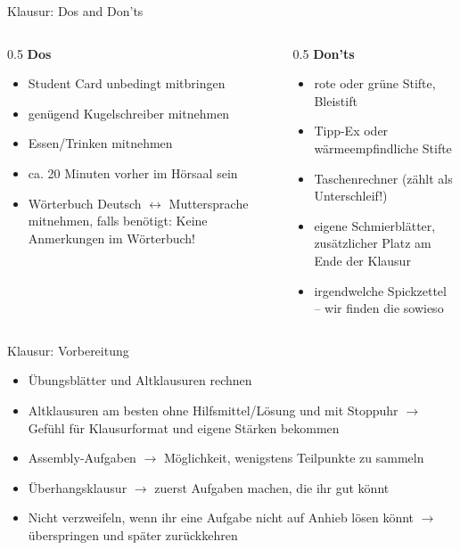 \begin{frame}[c]{Klausur: Dos and Don'ts}{}
	\begin{columns}[c]
		\begin{column}{0.5\textwidth}
			\centering \textbf{Dos} \textcolor{TUMGreen}{\cmark}
			\vspace{\baselineskip}
			\begin{itemize}
				\item Student Card unbedingt mitbringen
				\item genügend Kugelschreiber mitnehmen
				\item Essen/Trinken mitnehmen
				\item ca. 20 Minuten vorher im Hörsaal sein
				\item Wörterbuch Deutsch $\leftrightarrow$ Muttersprache mitnehmen, falls benötigt: Keine Anmerkungen im Wörterbuch!
			\end{itemize}
		\end{column}
		\begin{column}{0.5\textwidth}
			\centering \textbf{Don'ts} \textcolor{TUMExtRed}{\xmark}
			\vspace{\baselineskip}
			\begin{itemize}
				\item rote oder grüne Stifte, Bleistift
				\item Tipp-Ex oder wärmeempfindliche Stifte
				\item Taschenrechner (zählt als Unterschleif!)
				\item eigene Schmierblätter, zusätzlicher Platz am Ende der Klausur
				\item irgendwelche Spickzettel -- wir finden die sowieso
			\end{itemize}
		\end{column}
	\end{columns}
\end{frame}

\begin{frame}[c]{Klausur: Vorbereitung}{}
	\begin{itemize}
		\item Übungsblätter und Altklausuren rechnen
		\item Altklausuren am besten ohne Hilfsmittel/Lösung und mit Stoppuhr $\rightarrow$ Gefühl für Klausurformat und eigene Stärken bekommen
		\item Assembly-Aufgaben $\rightarrow$ Möglichkeit, wenigstens Teilpunkte zu sammeln
		\item Überhangsklausur $\rightarrow$ zuerst Aufgaben machen, die ihr gut könnt
		\item Nicht verzweifeln, wenn ihr eine Aufgabe nicht auf Anhieb lösen könnt $\rightarrow$ überspringen und später zurückkehren
	\end{itemize}
\end{frame}

